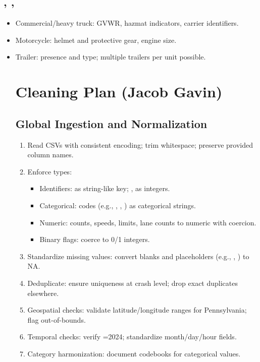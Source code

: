 \documentclass[journal]{IEEEtran}
\begin{document}
\subsection{, , }
\begin{itemize}
\item Commercial/heavy truck: GVWR, hazmat indicators, carrier identifiers.
\item Motorcycle: helmet and protective gear, engine size.
\item Trailer: presence and type; multiple trailers per unit possible.


\section{Cleaning Plan (Jacob Gavin)}

\subsection{Global Ingestion and Normalization}
\begin{enumerate}
\item Read CSVs with consistent encoding; trim whitespace; preserve provided column names.
\item Enforce types:
    \begin{itemize}
      \item Identifiers:  as string-like key; ,  as integers.
      \item Categorical: codes (e.g., , , ) as categorical strings.
      \item Numeric: counts, speeds, limits, lane counts to numeric with coercion.
      \item Binary flags: coerce to 0/1 integers.
    \end{itemize}
\item Standardize missing values: convert blanks and placeholders (e.g., , ) to NA.
\item Deduplicate: ensure  uniqueness at crash level; drop exact duplicates elsewhere.
\item Geospatial checks: validate latitude/longitude ranges for Pennsylvania; flag out-of-bounds.
\item Temporal checks: verify =2024; standardize month/day/hour fields.
\item Category harmonization: document codebooks for categorical values.
\end{enumerate}


\end{itemize}
\end{document}
